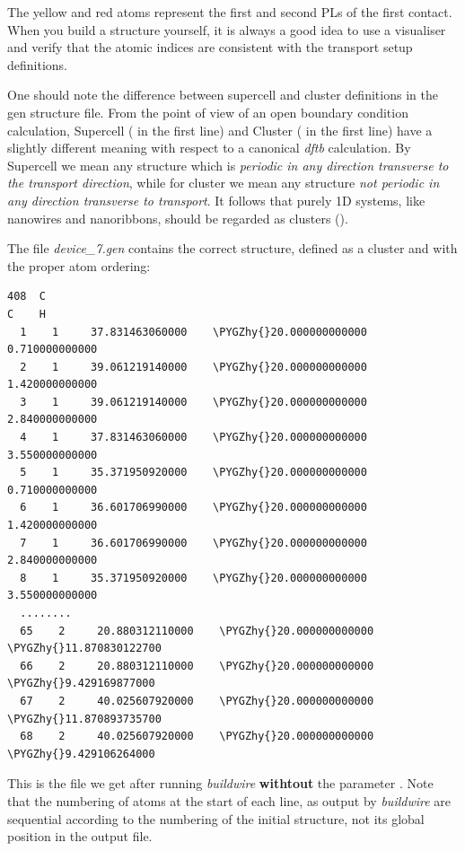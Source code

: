 \documentclass[a4paper,11pt,english]{sphinxmanual}
\def\PYGZhy{\char`\-}
\begin{document}
{{The yellow and red atoms represent the first and second PLs of the
first contact. When you build a structure yourself, it is always a
good idea to use a visualiser and verify that the atomic indices are
consistent with the transport setup definitions.

One should note the difference between supercell and cluster definitions in the gen
structure file. From the point of view of an open boundary condition
calculation, Supercell ( in the first line) and Cluster ( in the first line) have a slightly
different meaning with respect to a canonical \emph{dftb} calculation. By
Supercell we mean any structure which is \emph{periodic in any direction
transverse to the transport direction}, while for cluster we mean any
structure \emph{not periodic in any direction transverse to transport}. It
follows that purely 1D systems, like nanowires and nanoribbons, should
be regarded as clusters ().

The file \emph{device\_7.gen} contains the correct structure, defined as
a cluster and with the proper atom ordering:
%
\begin{Verbatim}[commandchars=\\\{\}]
408  C
C    H
  1    1     37.831463060000    \PYGZhy{}20.000000000000      0.710000000000
  2    1     39.061219140000    \PYGZhy{}20.000000000000      1.420000000000
  3    1     39.061219140000    \PYGZhy{}20.000000000000      2.840000000000
  4    1     37.831463060000    \PYGZhy{}20.000000000000      3.550000000000
  5    1     35.371950920000    \PYGZhy{}20.000000000000      0.710000000000
  6    1     36.601706990000    \PYGZhy{}20.000000000000      1.420000000000
  7    1     36.601706990000    \PYGZhy{}20.000000000000      2.840000000000
  8    1     35.371950920000    \PYGZhy{}20.000000000000      3.550000000000
  ........
  65    2     20.880312110000    \PYGZhy{}20.000000000000    \PYGZhy{}11.870830122700
  66    2     20.880312110000    \PYGZhy{}20.000000000000     \PYGZhy{}9.429169877000
  67    2     40.025607920000    \PYGZhy{}20.000000000000    \PYGZhy{}11.870893735700
  68    2     40.025607920000    \PYGZhy{}20.000000000000     \PYGZhy{}9.429106264000
\end{Verbatim}

This is the file we get after running \emph{buildwire} {\bf withtout} the parameter .
Note that the numbering of atoms at the start of each line, as output
by \emph{buildwire} are sequential according to the numbering of the
initial structure, not its global position in the output file.

}}
\end{document}
